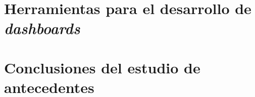 \section{Herramientas para el desarrollo de \textit{dashboards}}
\label{sec:herramientas_dashboard}

\section{Conclusiones del estudio de antecedentes}
\label{sec:conclusiones_antecedentes}
